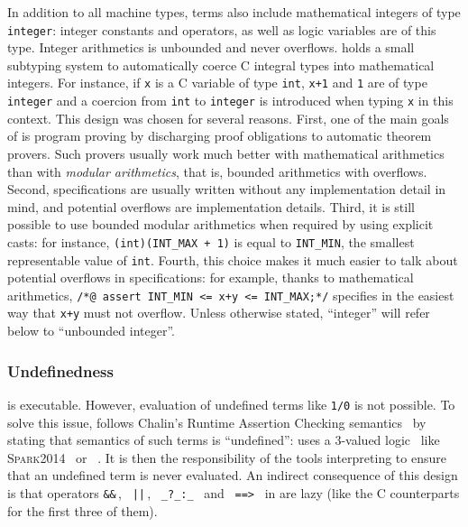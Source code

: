 In addition to all machine types, \eacsl terms also include mathematical
integers of type  \lstinline{integer}: integer constants and operators, as well as logic variables are of
this type. Integer arithmetics is unbounded and never
overflows. \eacsl holds a small subtyping system to automatically coerce C
integral types into mathematical integers. For instance, if \lstinline{x} is a C
variable of type \lstinline{int}, \lstinline{x+1} and \lstinline{1} are of type
\lstinline{integer} and a coercion from \lstinline{int} to \lstinline{integer} is
introduced when typing \lstinline{x} in this context. This design was chosen for
several reasons. First, one of the main goals of \framac is program proving by
discharging proof obligations to automatic theorem provers. Such provers usually
work much better with mathematical arithmetics than with \textit{modular
  arithmetics}, that is, bounded arithmetics with overflows.  Second,
specifications are usually written without any implementation detail in mind,
and potential overflows are implementation details. Third, it is still possible
to use bounded modular arithmetics when required by using explicit casts: for
instance, \lstinline{(int)(INT_MAX + 1)} is equal to \lstinline{INT_MIN}, the
smallest representable value of \lstinline{int}. Fourth, this choice makes it
much easier to talk about potential overflows in specifications: for example,
thanks to mathematical arithmetics, 
\lstinline{/*@ assert INT_MIN <= x+y <= INT_MAX;*/} specifies in the easiest way
that \lstinline{x+y} must not overflow.
Unless otherwise stated, ``integer'' will refer below to ``unbounded integer''.

\subsubsection{Undefinedness}\label{sec:undefined}

\eacsl is executable. However, evaluation of undefined terms like \lstinline{1/0} is not
possible. To solve this issue, \eacsl follows Chalin's Runtime Assertion
Checking semantics~\cite{chalin10} by stating that semantics of such terms is
``undefined'': \eacsl uses a 3-valued logic~\cite{konikowska91} like
\textsc{Spark2014}~\cite{sparkERTS2014} or \jml~\cite{assert}. It is
then the responsibility of the tools interpreting \eacsl{} to ensure that an
undefined term is never evaluated. An indirect consequence of this design is
that operators \lstinline{&&}\,, \ \lstinline{||}\,, \ \lstinline{_?_:_} \ and
\ \lstinline{==>} \ in \eacsl are lazy (like the C counterparts for the first
three of them).


